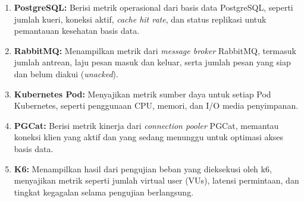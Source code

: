 \begin{enumerate}
    \item \textbf{PostgreSQL:} Berisi metrik operasional dari basis data PostgreSQL, seperti jumlah kueri, koneksi aktif, \textit{cache hit rate}, dan status replikasi untuk pemantauan kesehatan basis data.
    \item \textbf{RabbitMQ:} Menampilkan metrik dari \textit{message broker} RabbitMQ, termasuk jumlah antrean, laju pesan masuk dan keluar, serta jumlah pesan yang siap dan belum diakui (\textit{unacked}).
    \item \textbf{Kubernetes Pod:} Menyajikan metrik sumber daya untuk setiap Pod Kubernetes, seperti penggunaan CPU, memori, dan I/O media penyimpanan.
    \item \textbf{PGCat:} Berisi metrik kinerja dari \textit{connection pooler} PGCat, memantau koneksi klien yang aktif dan yang sedang menunggu untuk optimasi akses basis data.
    \item \textbf{K6:} Menampilkan hasil dari pengujian beban yang dieksekusi oleh k6, menyajikan metrik seperti jumlah virtual user (VUs), latensi permintaan, dan tingkat kegagalan selama pengujian berlangsung.
\end{enumerate}